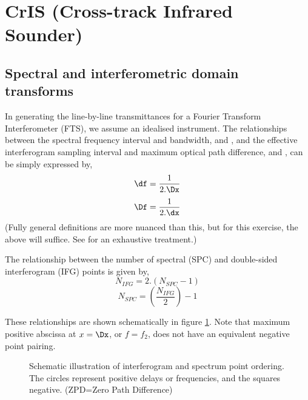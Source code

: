 \section{CrIS (Cross-track Infrared Sounder)}

\subsection{Spectral and interferometric domain transforms}
In generating the line-by-line transmittances for a Fourier Transform Interferometer (FTS), we assume an idealised instrument. The relationships between the spectral frequency interval and bandwidth, {\df} and {\Df}, and the effective interferogram sampling interval and maximum optical path difference, {\dx} and {\Dx}, can be simply expressed by,
\begin{equation}\df = \frac{1}{2.\Dx}\label{eqn:df_deltax}\end{equation}
\begin{equation}\Df = \frac{1}{2.\dx}\label{eqn:deltaf_dx}\end{equation}
(Fully general definitions are more nuanced than this, but for this exercise, the above will suffice. See \cite{Bell1972} for an exhaustive treatment.)

The relationship between the number of spectral (SPC) and double-sided interferogram (IFG) points is given by,
\begin{equation}N_{IFG} = 2.(N_{SPC}-1)\end{equation}
\begin{equation}N_{SPC} = \left(\frac{N_{IFG}}{2}\right) - 1\end{equation}

These relationships are shown schematically in figure \ref{fig:X_F_defn}. Note that maximum positive abscissa at $x = \Dx$, or $f = f_{2}$, does not have an equivalent negative point pairing.
\begin{figure}[htp]
  \centering
  
  \caption{Schematic illustration of interferogram and spectrum point ordering. The circles represent positive delays or frequencies, and the squares negative. (ZPD=Zero Path Difference)}
  \label{fig:X_F_defn}
\end{figure}

